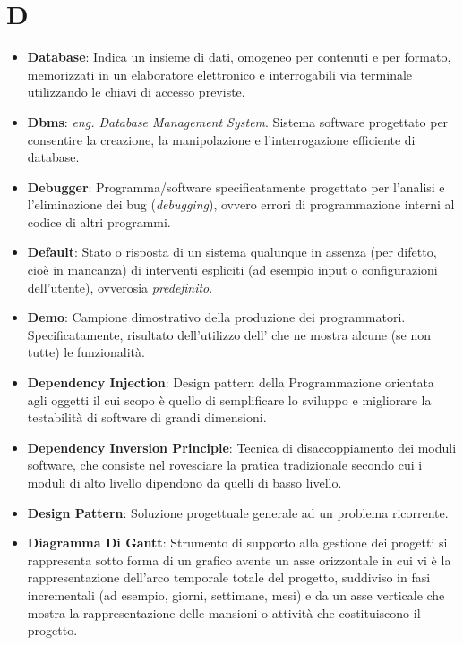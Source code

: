 \section*{D}
\begin{itemize}
	\item
	\textbf{Database}: Indica un insieme di dati, omogeneo per contenuti e per formato, memorizzati in un elaboratore elettronico e interrogabili via terminale utilizzando le chiavi di accesso previste.
	\item
	\textbf{Dbms}: \textit{eng. Database Management System}. Sistema software progettato per consentire la creazione, la manipolazione e l'interrogazione efficiente di database.
	\item
	\textbf{Debugger}: Programma/software specificatamente progettato per l'analisi e l'eliminazione dei bug (\textit{debugging}), ovvero errori di programmazione interni al codice di altri programmi.
	\item
	\textbf{Default}: Stato o risposta di un sistema qualunque in assenza (per difetto, cioè in mancanza) di interventi espliciti (ad esempio input o configurazioni dell'utente), ovverosia \textit{predefinito}.
	\item
	\textbf{Demo}: Campione dimostrativo della produzione dei programmatori. Specificatamente, risultato dell'utilizzo dell' che ne mostra alcune (se non tutte) le funzionalità.
	\item
	\textbf{Dependency Injection}: Design pattern della Programmazione orientata agli oggetti il cui scopo è quello di semplificare lo sviluppo e migliorare la testabilità di software di grandi dimensioni.
	\item
	\textbf{Dependency Inversion Principle}: Tecnica di disaccoppiamento dei moduli software, che consiste nel rovesciare la pratica tradizionale secondo cui i moduli di alto livello dipendono da quelli di basso livello.
	\item
	\textbf{Design Pattern}: Soluzione progettuale generale ad un problema ricorrente.
	\item
	\textbf{Diagramma Di Gantt}: Strumento di supporto alla gestione dei progetti si rappresenta sotto forma di un grafico avente un asse orizzontale in cui vi è la rappresentazione dell'arco temporale totale del progetto, suddiviso in fasi incrementali (ad esempio, giorni, settimane, mesi) e da un asse verticale che mostra la rappresentazione delle mansioni o attività che costituiscono il progetto.
\end{itemize}
\newpage